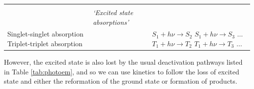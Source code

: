 \documentclass[
]{book}
\begin{document}
\begin{longtable}[]{@{}lll@{}}
\begin{minipage}[t]{0.23\columnwidth}
\end{minipage}\tabularnewline
\begin{minipage}[t]{0.35\columnwidth}\raggedright
\strut
\end{minipage} & \begin{minipage}[t]{0.33\columnwidth}\raggedright
\emph{`Excited state absorptions'}\strut
\end{minipage} & \begin{minipage}[t]{0.23\columnwidth}\raggedright
\strut
\end{minipage}\tabularnewline
\begin{minipage}[t]{0.35\columnwidth}\raggedright
Singlet-singlet absorption Triplet-triplet absorption\strut
\end{minipage} & \begin{minipage}[t]{0.33\columnwidth}\raggedright
\strut
\end{minipage} & \begin{minipage}[t]{0.23\columnwidth}\raggedright
\(S_1 + h \nu \longrightarrow S_2\) \(S_1 + h \nu \longrightarrow S_3\) \(\dots\)\(T_1 + h \nu \longrightarrow T_2\) \(T_1 + h \nu \longrightarrow T_3\) \(\dots\)\strut
\end{minipage}\tabularnewline
\bottomrule
\end{longtable}

However, the excited state is also lost by the usual deactivation pathways listed in Table \ref{tab:photoem}, and so we can use kinetics to follow the loss of excited state and either the reformation of the ground state or formation of products.
\end{document}
